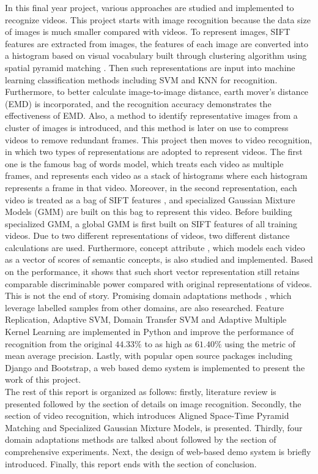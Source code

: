 \noindent In this final year project, various approaches are studied and implemented to recognize videos. This project starts with image recognition because the data size of images is much smaller compared with videos. To represent images, SIFT features \cite{lowe2004distinctive} are extracted from images, the features of each image are converted into a histogram based on visual vocabulary built through clustering algorithm using spatial pyramid matching \cite{lazebnik2006beyond}. Then such representations are input into machine learning classification methods including SVM and KNN for recognition. Furthermore, to better calculate image-to-image distance, earth mover's distance (EMD) \cite{rubner2000earth} is incorporated, and the recognition accuracy demonstrates the effectiveness of EMD. Also, a method to identify representative images from a cluster of images is introduced, and this method is later on use to compress videos to remove redundant frames. This project then moves to video recognition, in which two types of representations are adopted to represent videos. The first one is the famous bag of words model, which treats each video as multiple frames, and represents each video as a stack of histograms \cite{duan2012visual} where each histogram represents a frame in that video. Moreover, in the second representation, each video is treated as a bag of SIFT features \cite{zhou2008sift}, and specialized Gaussian Mixture Models (GMM) are built on this bag to represent this video. Before building specialized GMM, a global GMM is first built on SIFT features of all training videos. Due to two different representations of videos, two different distance calculations are used. Furthermore, concept attribute \cite{liu2013video}, which models each video as a vector of scores of semantic concepts, is also studied and implemented. Based on the performance, it shows that such short vector representation still retains comparable discriminable power compared with original representations of videos. This is not the end of story. Promising domain adaptations methods \cite{duan2012visual, duan2009domain, yang2007cross, daume2007frustratingly}, which leverage labelled samples from other domains, are also researched. Feature Replication, Adaptive SVM, Domain Transfer SVM and Adaptive Multiple Kernel Learning are implemented in Python and improve the performance of recognition from the original $44.33\%$ to as high as $61.40\%$ using the metric of mean average precision. Lastly, with popular open source packages including Django and Bootstrap, a web based demo system is implemented to present the work of this project. \\

\noindent The rest of this report is organized as follows: firstly, literature review is presented followed by the section of details on image recognition. Secondly, the section of video recognition, which introduces Aligned Space-Time Pyramid Matching and Specialized Gaussian Mixture Models, is presented. Thirdly, four domain adaptations methods are talked about followed by the section of comprehensive experiments. Next, the design of web-based demo system is briefly introduced. Finally, this report ends with the section of conclusion. 